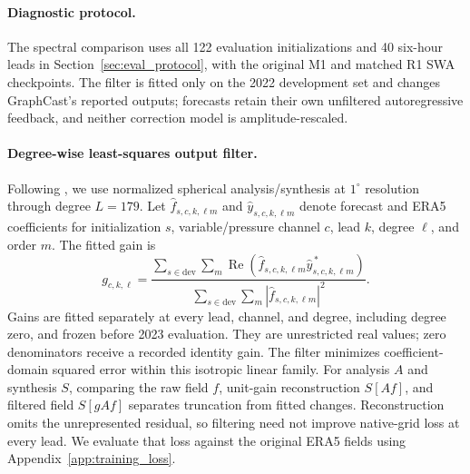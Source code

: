 \documentclass{article}
\newcommand{\vfourchange}[1]{{\color{blue}#1}}
\newcommand{\vfourred}[1]{{\color{blue}#1}}
\begin{document}
\paragraph{\vfourred{Diagnostic protocol.}}
\vfourred{The spectral comparison uses all 122 evaluation initializations and 40 six-hour leads in Section~\ref{sec:eval_protocol}, with the original M1 and matched \vfourchange{R1} SWA checkpoints. The filter is fitted only on the 2022 development set and changes GraphCast's reported outputs; forecasts retain their own unfiltered autoregressive feedback, and neither correction model is amplitude-rescaled.}

\paragraph{\vfourred{Degree-wise least-squares output filter.}}
\vfourred{Following \citet[Supplementary Section~7.4.2]{lam2023graphcast}, we use normalized spherical analysis/synthesis at $1^\circ$ resolution through degree $L=179$. Let $\widehat f_{s,c,k,\ell m}$ and $\widehat y_{s,c,k,\ell m}$ denote forecast and ERA5 coefficients for initialization $s$, variable/pressure channel $c$, lead $k$, degree $\ell$, and order $m$. The fitted gain is}
\vfourred{\begin{equation}
g_{c,k,\ell}=
\frac{\sum_{s\in\mathrm{dev}}\sum_m
       \operatorname{Re}(\widehat f_{s,c,k,\ell m}\widehat y_{s,c,k,\ell m}^{\,*})}
     {\sum_{s\in\mathrm{dev}}\sum_m |\widehat f_{s,c,k,\ell m}|^2}.
\label{eq:spectral_filter}
\end{equation}}
\vfourred{Gains are fitted separately at every lead, channel, and degree, including degree zero, and frozen before 2023 evaluation. They are unrestricted real values; zero denominators receive a recorded identity gain. The filter minimizes coefficient-domain squared error within this isotropic linear family. For analysis $A$ and synthesis $S$, comparing the raw field $f$, unit-gain reconstruction $S[A f]$, and filtered field $S[g A f]$ separates truncation from fitted changes. Reconstruction omits the unrepresented residual, so filtering need not improve native-grid loss at every lead. We evaluate that loss against the original ERA5 fields using Appendix~\ref{app:training_loss}.}
\end{document}
